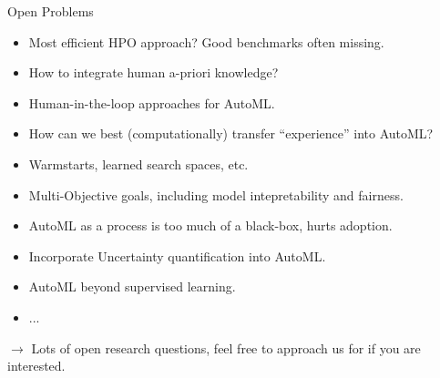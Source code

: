 	\begin{frame}{Open Problems}
		\begin{itemize}
			\item Most efficient HPO approach? Good benchmarks often missing.
			\item How to integrate human a-priori knowledge?
			\item Human-in-the-loop approaches for AutoML.
			\item How can we best (computationally) transfer “experience” into AutoML? 
			\item Warmstarts, learned search spaces, etc.
			\item Multi-Objective goals, including model intepretability and fairness.
			\item AutoML as a process is too much of a black-box, hurts adoption.
			\item Incorporate Uncertainty quantification into AutoML.
			\item AutoML beyond supervised learning.
			\item ...
		\end{itemize}
	
		$\longrightarrow$ Lots of open research questions, feel free to approach us for if you are interested. 

	\end{frame}


